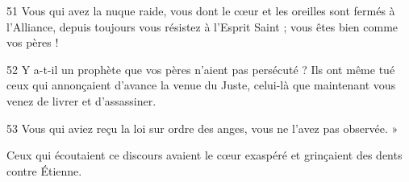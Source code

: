 51 Vous qui avez la nuque raide, vous dont le cœur et les oreilles sont fermés à l’Alliance, depuis toujours vous résistez à l’Esprit Saint ; vous êtes bien comme vos pères !

52 Y a-t-il un prophète que vos pères n’aient pas persécuté ? Ils ont même tué ceux qui annonçaient d’avance la venue du Juste, celui-là que maintenant vous venez de livrer et d’assassiner.

53 Vous qui aviez reçu la loi sur ordre des anges, vous ne l’avez pas observée. »

Ceux qui écoutaient ce discours avaient le cœur exaspéré
	et grinçaient des dents contre Étienne.
